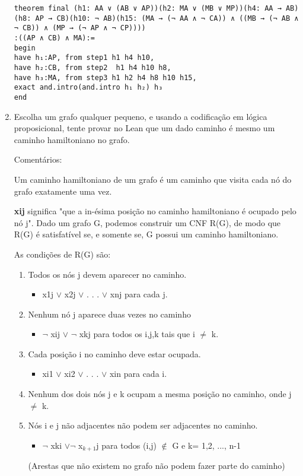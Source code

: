 \begin{enumerate}
\begin{lstlisting}
theorem final (h1: AA ∨ (AB ∨ AP))(h2: MA ∨ (MB ∨ MP))(h4: AA → AB)
(h8: AP → CB)(h10: ¬ AB)(h15: (MA → (¬ AA ∧ ¬ CA)) ∧ ((MB → (¬ AB ∧ ¬ CB)) ∧ (MP → (¬ AP ∧ ¬ CP))))
:((AP ∧ CB) ∧ MA):=
begin
have h₁:AP, from step1 h1 h4 h10,
have h₂:CB, from step2  h1 h4 h10 h8,
have h₃:MA, from step3 h1 h2 h4 h8 h10 h15,
exact and.intro(and.intro h₁ h₂) h₃ 
end

\end{lstlisting}
\bigbreak
\item Escolha um grafo qualquer pequeno, e usando a codificação em lógica proposicional, tente provar no Lean que um dado caminho é mesmo um caminho hamiltoniano no grafo.

Comentários:

Um caminho hamiltoniano de um grafo é um caminho que visita cada nó do grafo exatamente uma vez.

\textbf{xij} significa "que a in-ésima posição no caminho hamiltoniano é ocupado pelo nó j".
Dado um grafo G, podemos construir um CNF R(G), de modo que R(G) é satisfatível se, e somente se, G possui um caminho hamiltoniano.

As condições de R(G) são:
\begin{enumerate}
    \item Todos os nós j devem aparecer no caminho. 
    \begin{itemize}
    \item x1j $\lor$ x2j $\lor$ . . . $\lor$ xnj para cada j.
    \end{itemize}
    \item Nenhum nó j aparece duas vezes no caminho
    \begin{itemize}
    \item $\neg$ xij $\lor$ $\neg$ xkj para todos os i,j,k tais que i $\neq $ k.
    \end{itemize}
    \item Cada posição i no caminho deve estar ocupada.
    \begin{itemize}
    \item xi1 $\lor$ xi2 $\lor$ . . . $\lor$ xin para cada i.
    \end{itemize}
    \item Nenhum dos dois nós j e k ocupam  a mesma posição no caminho, onde j $\neq $ k.
    \item Nós i e j não adjacentes não podem ser adjacentes no caminho. 
    \begin{itemize}
    \item $\neg$ xki $\lor \neg$ x$_{k + 1}$j
    para todos (i,j) $\notin$ G e k= 1,2, ..., n-1 
    \end{itemize}
    (Arestas que não existem no grafo não podem fazer parte do caminho)
\end{enumerate}


\end{enumerate}
